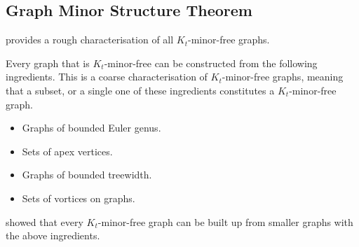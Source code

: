 \subsection{Graph Minor Structure Theorem}
\textcite{robertsonGraphMinorsXVII1999} provides a rough characterisation of all \(K_t\)-minor-free graphs. 

Every graph that is $K_t$-minor-free can be constructed from the following ingredients. This is a coarse characterisation of $K_t$-minor-free graphs, meaning that a subset, or a single one of these ingredients constitutes a $K_t$-minor-free graph. 
\begin{itemize}
	\item Graphs of bounded Euler genus.
	\item Sets of apex vertices.
	\item Graphs of bounded treewidth.
	\item Sets of vortices on graphs.
\end{itemize}
\textcite{robertsonGraphMinorsXVII1999} showed that every \(K_t\)-minor-free graph can be built up from smaller graphs with the above ingredients.